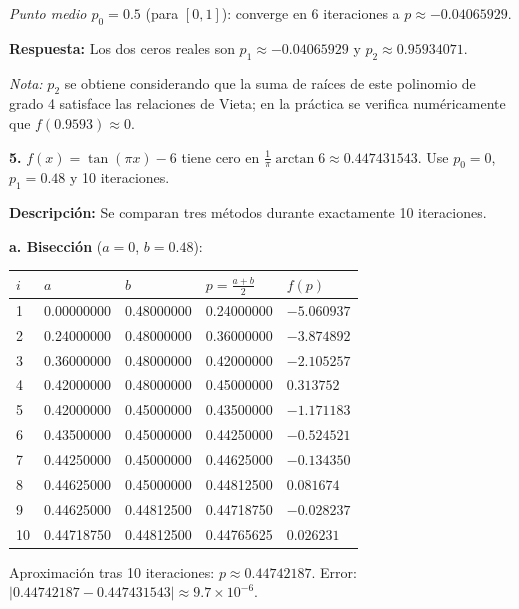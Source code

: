 \documentclass[12pt,a4paper]{article}
\begin{document}
\textit{Punto medio $p_0 = 0.5$} (para $[0,1]$): converge en 6 iteraciones a $p \approx -0.04065929$.

\textbf{Respuesta:} Los dos ceros reales son $p_1 \approx \boxed{-0.04065929}$ y $p_2 \approx \boxed{0.95934071}$.

\textit{Nota:} $p_2$ se obtiene considerando que la suma de ra\'ices de este polinomio de grado 4 satisface las relaciones de Vieta; en la pr\'actica se verifica numéricamente que $f(0.9593) \approx 0$.

\vspace{0.4cm}

\textbf{5.} $f(x) = \tan(\pi x) - 6$ tiene cero en $\frac{1}{\pi}\arctan 6 \approx 0.447431543$. Use $p_0 = 0$, $p_1 = 0.48$ y 10 iteraciones.

\textbf{Descripci\'on:} Se comparan tres m\'etodos durante exactamente 10 iteraciones.

\textbf{a. Bisecci\'on} ($a=0$, $b=0.48$):

\begin{center}\small
\begin{tabular}{C{0.4cm}C{2.0cm}C{2.0cm}C{2.2cm}C{2.0cm}}
\toprule
$i$ & $a$ & $b$ & $p = \tfrac{a+b}{2}$ & $f(p)$ \\
 & 0.00000000 & 0.48000000 & 0.24000000 & $-5.060937$ \\
2 & 0.24000000 & 0.48000000 & 0.36000000 & $-3.874892$ \\
3 & 0.36000000 & 0.48000000 & 0.42000000 & $-2.105257$ \\
4 & 0.42000000 & 0.48000000 & 0.45000000 & $0.313752$ \\
5 & 0.42000000 & 0.45000000 & 0.43500000 & $-1.171183$ \\
6 & 0.43500000 & 0.45000000 & 0.44250000 & $-0.524521$ \\
7 & 0.44250000 & 0.45000000 & 0.44625000 & $-0.134350$ \\
8 & 0.44625000 & 0.45000000 & 0.44812500 & $0.081674$ \\
9 & 0.44625000 & 0.44812500 & 0.44718750 & $-0.028237$ \\
10 & 0.44718750 & 0.44812500 & 0.44765625 & $0.026231$ \\
\bottomrule
\end{tabular}
\end{center}
Aproximaci\'on tras 10 iteraciones: $p \approx 0.44742187$. Error: $|0.44742187 - 0.447431543| \approx 9.7 \times 10^{-6}$.
\end{document}
